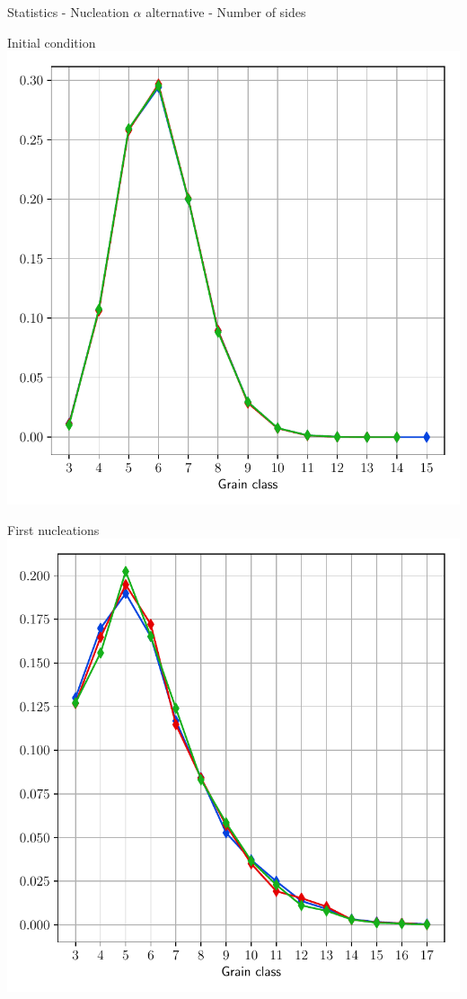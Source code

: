 \documentclass[usenames,dvipsnames]{beamer}
\begin{document}
\begin{frame}{Statistics - Nucleation $\alpha$ alternative - Number of sides}
\small
    \begin{minipage}{0.5\textwidth}
    \centering
    \scriptsize
    Initial condition
    \includegraphics[trim={0 1em 0 1.1em},clip=true,scale=0.335]{figures/stored_energy/SE/nsides/000000_nuclalternative_set.pdf}
    \end{minipage}%
    \begin{minipage}{0.5\textwidth}
    \centering
    \scriptsize
    First nucleations
    \includegraphics[trim={0 1em 0 1.1em},clip=true,scale=0.335]{figures/stored_energy/SE/nsides/000070_nuclalternative_set.pdf}\\

\end{minipage}
\end{frame}
\end{document}

